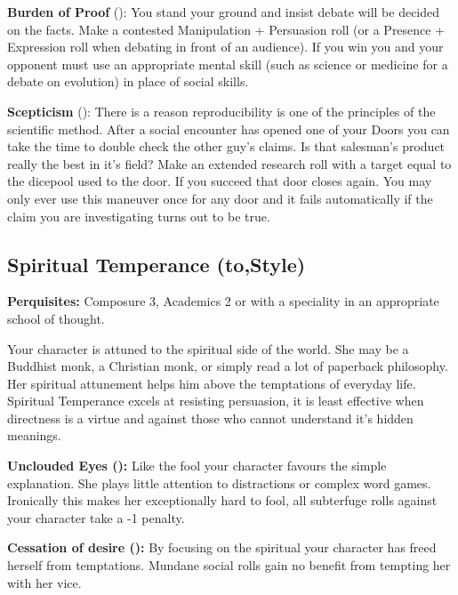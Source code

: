 \textbf{Burden of Proof} (\textbullet\textbullet\textbullet\textbullet): You stand your ground and insist debate will be decided on the facts. Make a contested Manipulation + Persuasion roll (or a Presence + Expression roll when debating in front of an audience). If you win you and your opponent must use an appropriate mental skill (such as science or medicine for a debate on evolution) in place of social skills.

\textbf{Scepticism} (\textbullet\textbullet\textbullet\textbullet\textbullet): There is a reason reproducibility is one of the principles of the scientific method. After a social encounter has opened one of your Doors you can take the time to double check the other guy's claims. Is that salesman's product really the best in it's field? Make an extended research roll with a target equal to the dicepool used to the door. If you succeed that door closes again. You may only ever use this maneuver once for any door and it fails automatically if the claim you are investigating turns out to be true.


\subsection*{Spiritual Temperance (\textbullet\nobreak\hspace{.16667em}to\nobreak\hspace{.16667em}\textbullet\textbullet\textbullet\textbullet\textbullet,\nobreak\hspace{.16667em}Style)}

\textbf{Perquisites:} Composure 3, Academics 2 or with a speciality in an appropriate school of thought.

Your character is attuned to the spiritual side of the world. She may be a Buddhist monk, a Christian monk, or simply read a lot of paperback philosophy. Her spiritual attunement helps him above the temptations of everyday life. Spiritual Temperance excels at resisting persuasion, it is least effective when directness is a virtue and against those who cannot understand it's hidden meanings.


\textbf{Unclouded Eyes (\textbullet):} Like the fool your character favours the simple explanation. She plays little attention to distractions or complex word games. Ironically this makes her exceptionally hard to fool, all subterfuge rolls against your character take a -1 penalty.

\textbf{Cessation of desire (\textbullet\textbullet):} By focusing on the spiritual your character has freed herself from temptations. Mundane social rolls gain no benefit from tempting her with her vice.

